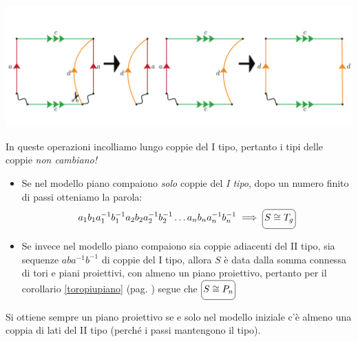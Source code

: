 \begin{demonstration}
\begin{enumerate}
	\begin{center}
		\includegraphics[trim=0cm 0cm 0cm 0cm, clip, scale=0.35]{images/cutandpastealgorithmstep4-4.pdf}
	\end{center}
\end{enumerate}
In queste operazioni incolliamo lungo coppie del I tipo, pertanto i tipi delle coppie \textit{non cambiano!}\\
\begin{itemize}
	\item Se nel modello piano compaiono \textit{solo} coppie del \textit{I tipo}, dopo un numero finito di passi otteniamo la parola:
	\begin{equation}
		a_1b_1a_1^{-1}b_1^{-1}a_2b_2a_2^{-1}b_2^{-1}\ldots a_nb_na_n^{-1}b_n^{-1}\implies \ovaled{S\cong T_g}
	\end{equation}
\item Se invece nel modello piano compaiono sia coppie adiacenti del II tipo, sia sequenze $aba^{-1}b^{-1}$ di coppie del I tipo, allora $S$ è data dalla somma connessa di tori e piani proiettivi, con almeno un piano proiettivo, pertanto per il corollario \ref{toropiupiano} (pag. \pageref{toropiupiano}) segue che $\ovaled{S\cong P_n}$
\end{itemize}
\vspace{-3mm}
\end{demonstration}
\begin{observe}
	Si ottiene sempre un piano proiettivo se e solo nel modello iniziale c'è almeno una coppia di lati del II tipo (perché i passi mantengono il tipo).
\end{observe}
